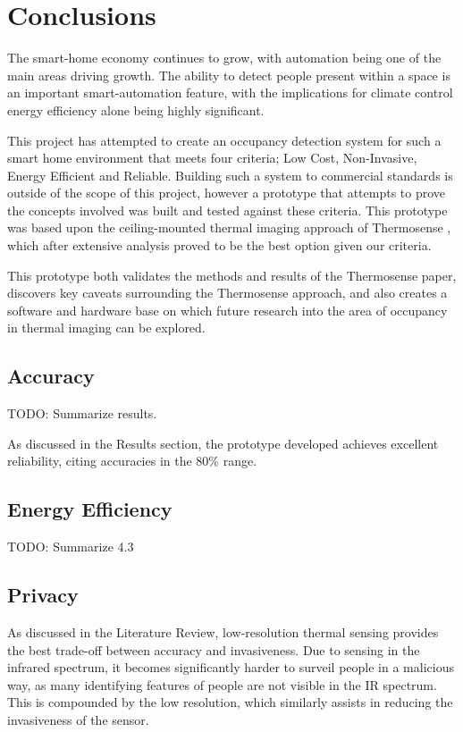 \documentclass[../thesis/thesis.tex]{subfiles}
\begin{document}
 \chapter{Conclusions}

The smart-home economy continues to grow, with automation being one of the main areas driving growth. The ability to detect people present within a space is an important smart-automation feature, with the implications for climate control energy efficiency alone being highly significant.

This project has attempted to create an occupancy detection system for such a smart home environment that meets four criteria; Low Cost, Non-Invasive, Energy Efficient and Reliable. Building such a system to commercial standards is outside of the scope of this project, however a prototype that attempts to prove the concepts involved was built and tested against these criteria. This prototype was based upon the ceiling-mounted thermal imaging approach of Thermosense \cite{beltran2013thermosense}, which after extensive analysis proved to be the best option given our criteria.

This prototype both validates the methods and results of the Thermosense paper, discovers key caveats surrounding the Thermosense approach, and also creates a software and hardware base on which future research into the area of occupancy in thermal imaging can be explored.

\section{Accuracy}
TODO: Summarize results.

As discussed in the Results section, the prototype developed achieves excellent reliability, citing accuracies in the 80\% range. 

\section{Energy Efficiency}
TODO: Summarize 4.3

\section{Privacy}
As discussed in the Literature Review, low-resolution thermal sensing provides the best trade-off between accuracy and invasiveness. Due to sensing in the infrared spectrum, it becomes significantly harder to surveil people in a malicious way, as many identifying features of people are not visible in the IR spectrum. This is compounded by the low resolution, which similarly assists in reducing the invasiveness of the sensor.
\end{document}
